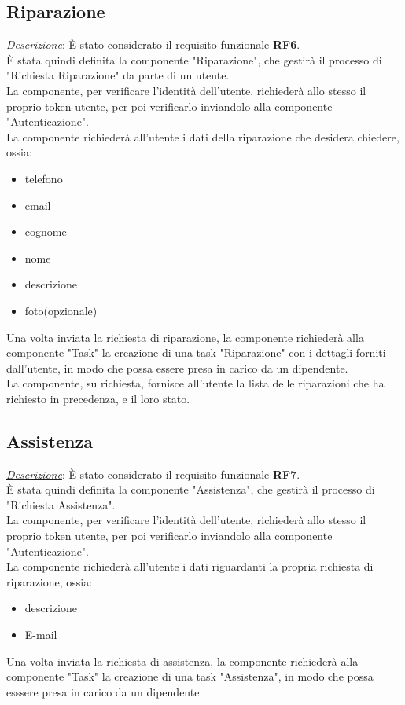 \documentclass{report}
\begin{document}
\subsection*{Riparazione}
\uline{\textit{Descrizione}}:
È stato considerato il requisito funzionale \textbf{RF6}.\\
È stata quindi definita la componente "Riparazione", che gestirà il processo di "Richiesta Riparazione" da parte di un utente.\\
La componente, per verificare l'identità dell'utente, richiederà allo stesso il proprio token utente, per poi verificarlo inviandolo alla componente "Autenticazione".\\
La componente richiederà all'utente i dati della riparazione che desidera chiedere, ossia:
\begin{itemize}
	\item telefono
	\item email
	\item cognome
	\item nome
	\item descrizione
	\item foto(opzionale)
\end{itemize}
Una volta inviata la richiesta di riparazione, la componente richiederà alla componente "Task" la creazione di una task "Riparazione" con i dettagli forniti dall'utente, 
in modo che possa essere presa in carico da un dipendente.\\
La componente, su richiesta, fornisce all'utente la lista delle riparazioni che ha richiesto in precedenza, e il loro stato.

\subsection*{Assistenza}
\uline{\textit{Descrizione}}:
È stato considerato il requisito funzionale \textbf{RF7}.\\
È stata quindi definita la componente "Assistenza", che gestirà il processo di "Richiesta Assistenza".\\
La componente, per verificare l'identità dell'utente, richiederà allo stesso il proprio token utente, per poi verificarlo inviandolo alla componente "Autenticazione".\\
La componente richiederà all'utente i dati riguardanti la propria richiesta di riparazione, ossia:
\begin{itemize}
	\item descrizione
	\item E-mail
\end{itemize}
Una volta inviata la richiesta di assistenza, la componente richiederà alla componente "Task" la creazione di una task "Assistenza",
in modo che possa esssere presa in carico da un dipendente.
\end{document}
